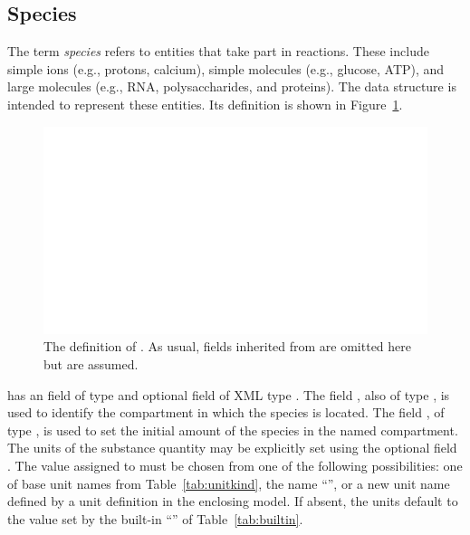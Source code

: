 \documentclass[10pt,twocolumntoc]{cekarticle}
\newcommand{\vref}[1]{\ref{#1}}
\begin{document}
\subsection{Species}
\label{sec:species}

The term \emph{species} refers to entities that take part in
reactions. These include simple ions (e.g., protons, calcium),
simple molecules (e.g., glucose, ATP), and large molecules (e.g.,
RNA, polysaccharides, and proteins).  The  data
structure is intended to represent these entities.  Its definition
is shown in Figure~\vref{fig:species}.

\begin{figure}[htb]
  \centering
  \includegraphics[scale = 0.68]{specie}
  \caption{The definition of .  As usual, fields inherited from
     are omitted here but are assumed.}
  \label{fig:species}
\end{figure}

 has an  field of type  and
optional  field of XML type . The field
, also of type , is used to
identify the compartment in which the species is located. The
field , of type , is used to
set the initial amount of the species in the named compartment.
The units of the substance quantity may be explicitly set using
the optional field . The value assigned to
 must be chosen from one of the following
possibilities: one of base unit names from
Table~\vref{tab:unitkind}, the name ``'', or a new
unit name defined by a unit definition in the enclosing model.  If
absent, the units default to the value set by the built-in
``'' of Table~\vref{tab:builtin}.
\end{document}

